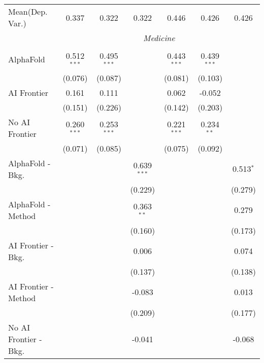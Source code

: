 \begin{tabular}{lcccccc}
Mean(Dep. Var.) & 0.337 & 0.322 & 0.322 & 0.446 & 0.426 & 0.426 \\
 & \multicolumn{6}{c}{\textit{Medicine}} \\ \\
   AlphaFold               & 0.512$^{***}$ & 0.495$^{***}$ &               & 0.443$^{***}$ & 0.439$^{***}$ &   \\   
                           & (0.076)       & (0.087)       &               & (0.081)       & (0.103)       &   \\   
   AI Frontier             & 0.161         & 0.111         &               & 0.062         & -0.052        &   \\   
                           & (0.151)       & (0.226)       &               & (0.142)       & (0.203)       &   \\   
   No AI Frontier          & 0.260$^{***}$ & 0.253$^{***}$ &               & 0.221$^{***}$ & 0.234$^{**}$  &   \\   
                           & (0.071)       & (0.085)       &               & (0.075)       & (0.092)       &   \\   
   AlphaFold - Bkg.        &               &               & 0.639$^{***}$ &               &               & 0.513$^{*}$\\   
                           &               &               & (0.229)       &               &               & (0.279)\\   
   AlphaFold - Method      &               &               & 0.363$^{**}$  &               &               & 0.279\\   
                           &               &               & (0.160)       &               &               & (0.173)\\   
   AI Frontier - Bkg.      &               &               & 0.006         &               &               & 0.074\\   
                           &               &               & (0.137)       &               &               & (0.138)\\   
   AI Frontier - Method    &               &               & -0.083        &               &               & 0.013\\   
                           &               &               & (0.209)       &               &               & (0.177)\\   
   No AI Frontier - Bkg.   &               &               & -0.041        &               &               & -0.068\\   

\end{tabular}

